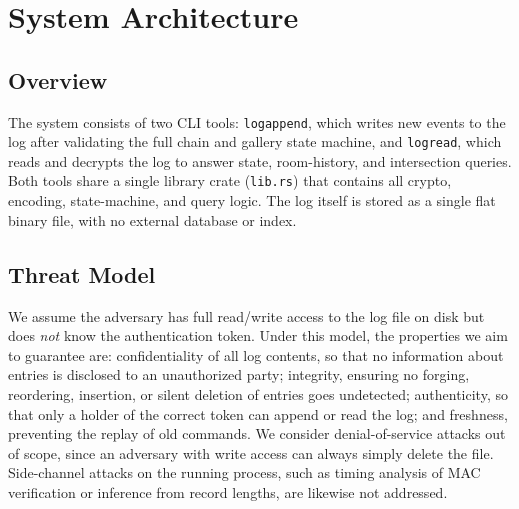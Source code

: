 \documentclass[a4paper, 12pt]{article}
\begin{document}
    \section{System Architecture}
    \subsection{Overview}
    The system consists of two CLI tools: \texttt{logappend}, which writes new events to the log after validating the full chain and gallery state machine, and \texttt{logread}, which reads and decrypts the log to answer state, room-history, and intersection queries. Both tools share a single library crate (\texttt{lib.rs}) that contains all crypto, encoding, state-machine, and query logic. The log itself is stored as a single flat binary file, with no external database or index.
    \subsection{Threat Model}
    We assume the adversary has full read/write access to the log file on disk but does \emph{not} know the authentication token. Under this model, the properties we aim to guarantee are: confidentiality of all log contents, so that no information about entries is disclosed to an unauthorized party; integrity, ensuring no forging, reordering, insertion, or silent deletion of entries goes undetected; authenticity, so that only a holder of the correct token can append or read the log; and freshness, preventing the replay of old commands. We consider denial-of-service attacks out of scope, since an adversary with write access can always simply delete the file. Side-channel attacks on the running process, such as timing analysis of MAC verification or inference from record lengths, are likewise not addressed.
\end{document}

